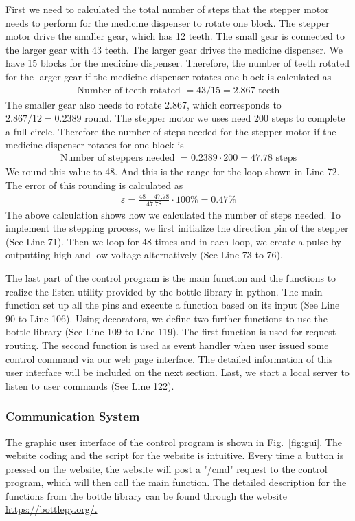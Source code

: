 \documentclass[12pt]{article}
\begin{document}
First we need to calculated the total number of steps that the stepper motor needs to perform for the medicine dispenser to rotate one block. The stepper motor drive the smaller gear, which has 12 teeth. The small gear is connected to the larger gear with 43 teeth. The larger gear drives the medicine dispenser. We have 15 blocks for the medicine dispenser. Therefore, the number of teeth rotated for the larger gear if the medicine dispenser rotates one block is calculated as
\begin{align*}
\text{Number of teeth rotated } = 43 / 15 = 2.867 \text{ teeth}
\end{align*}
The smaller gear also needs to rotate 2.867, which corresponds to $2.867/12 = 0.2389 $ round. The stepper motor we uses need 200 steps to complete a full circle. Therefore the number of steps needed for the stepper motor if the medicine dispenser rotates for one block is
\begin{align*}
\text{Number of steppers needed } = 0.2389 \cdot 200 = 47.78 \text{ steps}
\end{align*}
We round this value to 48. And this is the range for the loop shown in Line 72. The error of this rounding is calculated as
\begin{align*}
\varepsilon = \frac{48-47.78}{47.78} \cdot 100\% = 0.47 \%
\end{align*}
The above calculation shows how we calculated the number of steps needed. To implement the stepping process, we first initialize the direction pin of the stepper (See Line 71). Then we loop for 48 times and in each loop, we create a pulse by outputting high and low voltage alternatively (See Line 73 to 76).

The last part of the control program is the main function and the functions to realize the  listen utility provided by the bottle library in python. The main function set up all the pins and execute a function based on its input (See Line 90 to Line 106). Using decorators, we define two further functions to use the bottle library (See Line 109 to Line 119). The first function is used for request routing. The second function is used as event handler when user issued some control command via our web page interface. The detailed information of this user interface will be included on the next section. Last, we start a local server to listen to user commands (See Line 122).


\subsubsection{Communication System}
The graphic user interface of the control program is shown in Fig.~\ref{fig:gui}. The website coding and the script for the website is intuitive. Every time a button is pressed on the website, the website will post a "/cmd" request to the control program, which will then call the main function. The detailed description for the functions from the bottle library can be found through the website \url{https://bottlepy.org/.}
\end{document}
